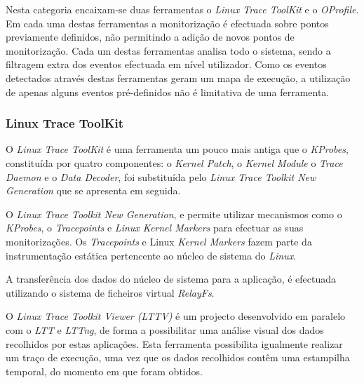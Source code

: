 Nesta categoria encaixam-se duas ferramentas o \textit{Linux Trace ToolKit} e o \textit{OProfile}.
Em cada uma destas ferramentas a monitorização é efectuada sobre pontos previamente definidos, não permitindo a adição de novos pontos de monitorização.
Cada um destas ferramentas analisa todo o sistema, sendo a filtragem extra dos eventos efectuada em nível utilizador.
Como os eventos detectados através destas ferramentas geram um mapa de execução, a utilização de apenas alguns eventos pré-definidos não é limitativa de uma ferramenta.

\subsubsection{Linux Trace ToolKit}\label{cap:linux_trace_toolkit_overview}

O \textit{Linux Trace ToolKit} é uma ferramenta um pouco mais antiga que o \textit{KProbes}, constituída por quatro componentes: o \textit{Kernel Patch}, o \textit{Kernel Module} o \textit{Trace Daemon} e o \textit{Data Decoder}, foi substituída pelo \textit{Linux Trace Toolkit New Generation} que se apresenta em seguida.


O \textit{Linux Trace Toolkit New Generation}, e permite utilizar mecanismos como o \textit{KProbes}, o \textit{Tracepoints}\cite{Mathieu2009} e \textit{Linux Kernel Markers}\cite{Mathieu2009} para efectuar as suas monitorizações.
Os \textit{Tracepoints} e Linux \textit{Kernel Markers} fazem parte da instrumentação estática pertencente ao núcleo de sistema do \textit{Linux}.

A transferência dos dados do núcleo de sistema para a aplicação, é efectuada utilizando o sistema de ficheiros virtual \textit{RelayFs}.


O \textit{Linux Trace Toolkit Viewer (LTTV)} é um projecto desenvolvido em paralelo com o \textit{LTT} e \textit{LTTng}, de forma a possibilitar uma análise visual dos dados recolhidos por estas aplicações.
Esta ferramenta possibilita igualmente realizar um traço de execução, uma vez que os dados recolhidos contêm uma estampilha temporal, do momento em que foram obtidos.
 
